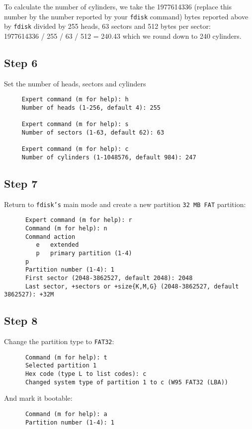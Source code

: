 \documentclass{article}
\begin{document}
      To calculate the number of cylinders, we take the 1977614336 (replace
      this number by the number reported by your \texttt{fdisk} command)
      bytes reported above by \texttt{fdisk} divided by 255 heads, 63 sectors
      and 512 bytes per sector: \\

      1977614336 / 255 / 63 / 512 = 240.43 which we round down to 240
      cylinders.
   \subsection*{Step 6}
     Set the number of heads, sectors and cylinders
     \begin{verbatim}
     Expert command (m for help): h 
     Number of heads (1-256, default 4): 255 

     Expert command (m for help): s 
     Number of sectors (1-63, default 62): 63 

     Expert command (m for help): c 
     Number of cylinders (1-1048576, default 984): 247
    \end{verbatim}
   \subsection*{Step 7}
      Return to \texttt{fdisk's} main mode and create a new partition 
      \texttt{32 MB FAT} partition: 
      \begin{verbatim}
      Expert command (m for help): r 
      Command (m for help): n 
      Command action 
         e   extended 
         p   primary partition (1-4) 
      p 
      Partition number (1-4): 1 
      First sector (2048-3862527, default 2048): 2048
      Last sector, +sectors or +size{K,M,G} (2048-3862527, default 3862527): +32M
      \end{verbatim}
   \subsection*{Step 8}
      Change the partition type to \texttt{FAT32}: 
      \begin{verbatim}
      Command (m for help): t 
      Selected partition 1 
      Hex code (type L to list codes): c 
      Changed system type of partition 1 to c (W95 FAT32 (LBA)) 
      \end{verbatim}

      And mark it bootable: 

      \begin{verbatim}
      Command (m for help): a 
      Partition number (1-4): 1
      \end{verbatim}
\end{document}
